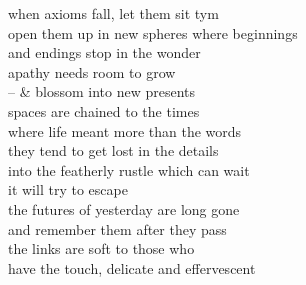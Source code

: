 when axioms fall,  let them sit tym\\
open them up in new spheres where beginnings\\
and endings stop in the wonder\\
apathy needs room to grow\\
-- \& blossom into new presents\\

spaces are chained to the times\\
where life meant more than the words\\
they tend to get lost in the details\\
into the featherly rustle which can wait\\
it will try to escape\\

the futures of yesterday are long gone\\
and remember them after they pass\\
the links are soft to those who\\
have the touch, delicate and effervescent\\
